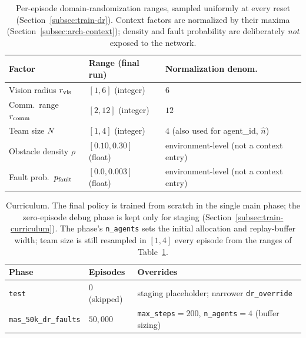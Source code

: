 \begin{table}[h]
\centering
\small
\begin{tabular}{lll}
\toprule
\textbf{Factor} & \textbf{Range (final run)} & \textbf{Normalization denom.} \\
\midrule
Vision radius $r_{\mathrm{vis}}$      & $[1, 6]$ (integer)     & $6$ \\
Comm.\ range $r_{\mathrm{comm}}$      & $[2, 12]$ (integer)    & $12$ \\
Team size $N$       & $[1, 4]$ (integer)     & $4$ (also used for agent\_id, $\hat n$) \\
Obstacle density $\rho$    & $[0.10, 0.30]$ (float) & environment-level (not a context entry) \\
Fault prob.\ $p_{\mathrm{fault}}$     & $[0.0, 0.003]$ (float) & environment-level (not a context entry) \\
\bottomrule
\end{tabular}
\caption{Per-episode domain-randomization ranges, sampled uniformly at every
reset (Section~\ref{subsec:train-dr}). Context factors are normalized by their
maxima (Section~\ref{subsec:arch-context}); density and fault probability are
deliberately \emph{not} exposed to the network.}
\label{tab:app-dr}
\end{table}

\begin{table}[h]
\centering
\small
\begin{tabular}{lll}
\toprule
\textbf{Phase} & \textbf{Episodes} & \textbf{Overrides} \\
\midrule
\texttt{test}               & $0$ (skipped)  & staging placeholder; narrower \texttt{dr\_override} \\
\texttt{mas\_50k\_dr\_faults} & $50{,}000$   & \texttt{max\_steps}${=}200$, \texttt{n\_agents}${=}4$ (buffer sizing) \\
\bottomrule
\end{tabular}
\caption{Curriculum. The final policy is trained from scratch in the single
main phase; the zero-episode debug phase is kept only for staging
(Section~\ref{subsec:train-curriculum}). The phase's \texttt{n\_agents} sets
the initial allocation and replay-buffer width; team size is still resampled
in $[1,4]$ every episode from the ranges of Table~\ref{tab:app-dr}.}
\label{tab:app-curriculum}
\end{table}

